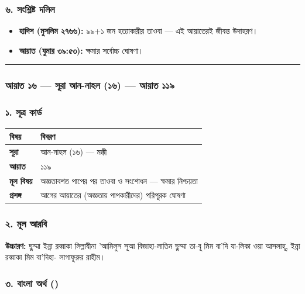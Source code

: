 \subsubsection*{৬. সংশ্লিষ্ট দলিল}

\begin{itemize}
\item \textbf{হাদিস (মুসলিম ২৭৬৬):} ৯৯+১ জন হত্যাকারীর তাওবা — এই আয়াতেরই জীবন্ত উদাহরণ।
\item \textbf{আয়াত (যুমার ৩৯:৫৩):} ক্ষমার সর্বোচ্চ ঘোষণা।
\end{itemize}
\medskip\hrule\medskip

\subsubsection*{আয়াত ১৬ — সূরা আন-নাহল (১৬) — আয়াত ১১৯}

\subsubsection*{১. সূত্র কার্ড}

\begin{table}[h]\centering\small
\begin{tabular}{ll}
বিষয় & বিবরণ \\
\hline
\textbf{সূরা} & আন-নাহল (১৬) — মক্কী \\
\textbf{আয়াত} & ১১৯ \\
\textbf{মূল বিষয়} & অজ্ঞতাবশত পাপের পর তাওবা ও সংশোধন — ক্ষমার নিশ্চয়তা \\
\textbf{প্রসঙ্গ} & আগের আয়াতের (অজ্ঞতায় পাপকারীদের) পরিপূরক ঘোষণা \\
\hline
\end{tabular}
\end{table}

\subsubsection*{২. মূল আরবি}

\begin{center}\end{center}
\textbf{উচ্চারণ:} ছুম্মা ইন্না রব্বাকা লিল্লাযীনা 'আমিলুস সূআ বিজাহা-লাতিন ছুম্মা তা-বূ মিম বা'দি যা-লিকা ওয়া আসলাহূ, ইন্না রব্বাকা মিম বা'দিহা- লাগাফূরুর রাহীম।

\subsubsection*{৩. বাংলা অর্থ ()}

